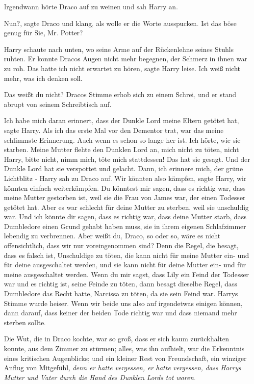 Irgendwann hörte Draco auf zu weinen und sah Harry an.

\glqq Nun?\grqq{}, sagte Draco und klang, als wolle er die Worte ausspucken.
\glqq Ist das böse genug für Sie, Mr. Potter?\grqq{}

Harry schaute nach unten, wo seine Arme auf der Rückenlehne seines Stuhls
ruhten. Er konnte Dracos Augen nicht mehr begegnen, der Schmerz in ihnen war zu
roh. \glqq Das hatte ich nicht erwartet zu hören\grqq{}, sagte Harry leise.
\glqq Ich weiß nicht mehr, was ich denken soll.\grqq{}

\glqq Das weißt du nicht?\grqq{} Dracos Stimme erhob sich zu einem Schrei, und
er stand abrupt von seinem Schreibtisch auf.

\glqq Ich habe mich daran erinnert, dass der Dunkle Lord meine Eltern getötet
hat\grqq{}, sagte Harry. \glqq Als ich das erste Mal vor den Dementor trat, war
das meine schlimmste Erinnerung. Auch wenn es schon so lange her ist. Ich hörte,
wie sie starben. Meine Mutter flehte den Dunklen Lord an, mich nicht zu töten,
nicht Harry, bitte nicht, nimm mich, töte mich stattdessen! Das hat sie gesagt.
Und der Dunkle Lord hat sie verspottet und gelacht. Dann, ich erinnere mich, der
grüne Lichtblitz -\grqq{} Harry sah zu Draco auf. \glqq Wir könnten also
kämpfen\grqq{}, sagte Harry, \glqq wir könnten einfach weiterkämpfen. Du
könntest mir sagen, dass es richtig war, dass meine Mutter gestorben ist, weil
sie die Frau von James war, der einen Todesser getötet hat. Aber es war schlecht
für deine Mutter zu sterben, weil sie unschuldig war. Und ich könnte dir sagen,
dass es richtig war, dass deine Mutter starb, dass Dumbledore einen Grund gehabt
haben muss, sie in ihrem eigenen Schlafzimmer lebendig zu verbrennen. Aber weißt
du, Draco, so oder so, wäre es nicht offensichtlich, dass wir nur voreingenommen
sind? Denn die Regel, die besagt, dass es falsch ist, Unschuldige zu töten, die
kann nicht für meine Mutter ein- und für deine ausgeschaltet werden, und sie
kann nicht für deine Mutter ein- und für meine ausgeschaltet werden. Wenn du mir
sagst, dass Lily ein Feind der Todesser war und es richtig ist, seine Feinde zu
töten, dann besagt dieselbe Regel, dass Dumbledore das Recht hatte, Narcissa zu
töten, da sie sein Feind war.\grqq{} Harrys Stimme wurde heiser. \glqq Wenn wir
beide uns also auf irgendetwas einigen können, dann darauf, dass keiner der
beiden Tode richtig war und dass niemand mehr sterben sollte.\grqq{}

Die Wut, die in Draco kochte, war so groß, dass er sich kaum zurückhalten
konnte, aus dem Zimmer zu stürmen; alles, was ihn aufhielt, war die Erkenntnis
eines kritischen Augenblicks; und ein kleiner Rest von Freundschaft, ein
winziger Anflug von Mitgefühl, \emph{denn er hatte vergessen, er hatte
vergessen, dass Harrys Mutter und Vater durch die Hand des Dunklen Lords tot
waren.}

